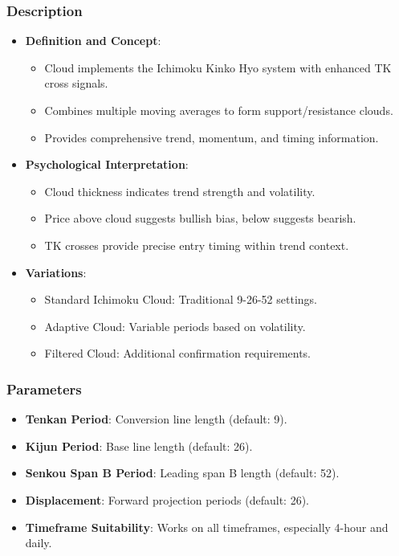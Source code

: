 \documentclass[12pt]{article}
\begin{document}
\subsubsection{Description}
\begin{itemize}
\item \textbf{Definition and Concept}:
  \begin{itemize}
  \item Cloud implements the Ichimoku Kinko Hyo system with enhanced TK cross signals.
  \item Combines multiple moving averages to form support/resistance clouds.
  \item Provides comprehensive trend, momentum, and timing information.
  \end{itemize}
\item \textbf{Psychological Interpretation}:
  \begin{itemize}
  \item Cloud thickness indicates trend strength and volatility.
  \item Price above cloud suggests bullish bias, below suggests bearish.
  \item TK crosses provide precise entry timing within trend context.
  \end{itemize}
\item \textbf{Variations}:
  \begin{itemize}
  \item Standard Ichimoku Cloud: Traditional 9-26-52 settings.
  \item Adaptive Cloud: Variable periods based on volatility.
  \item Filtered Cloud: Additional confirmation requirements.
  \end{itemize}
\end{itemize}

\subsubsection{Parameters}
\begin{itemize}
\item \textbf{Tenkan Period}: Conversion line length (default: 9).
\item \textbf{Kijun Period}: Base line length (default: 26).
\item \textbf{Senkou Span B Period}: Leading span B length (default: 52).
\item \textbf{Displacement}: Forward projection periods (default: 26).
\item \textbf{Timeframe Suitability}: Works on all timeframes, especially 4-hour and daily.
\end{itemize}
\end{document}
